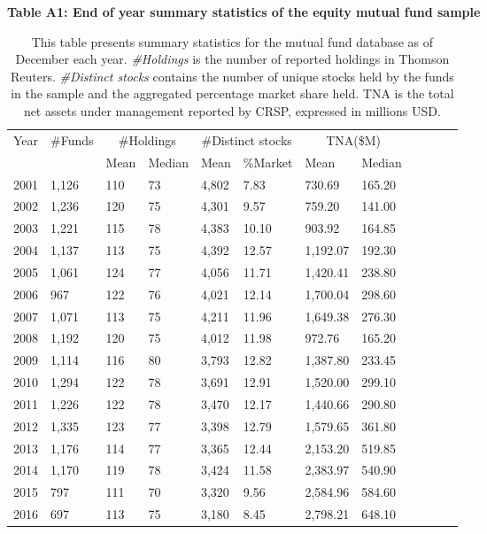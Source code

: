 \begin{singlespacing}
\begin{table}[h!]
\centering
\small
\setlength{\tabcolsep}{14pt}
{\captionsetup{justification=centering,singlelinecheck=off}
\caption*{\bfseries Table A1: End of year summary statistics of the equity mutual fund sample} }
\caption*{This table presents summary statistics for the mutual fund database as of December each year. \textit{\#Holdings} is the number of reported holdings in Thomson Reuters. \textit{\#Distinct stocks} contains the number of unique stocks held by the funds in the sample and the aggregated percentage market share held. TNA is the total net assets under management reported by CRSP, expressed in millions USD.    } \label{tableA1} 
\begin{tabular}{llllllllllll}
\hline
Year & \#Funds & \multicolumn{2}{c}{\#Holdings} & \multicolumn{2}{c}{\#Distinct stocks} & \multicolumn{2}{c}{TNA(\$M)}  \\ \cline{3-8} 
     &           & Mean           & Median          & Mean            & \%Market           & Mean           & Median             \\ \hline
     2001 & 1,126 & 110    & 73 & 4,802 & 7.83  & 730.69  & 165.20 \\
2002 & 1,236 & 120 & 75 & 4,301 & 9.57  & 759.20  & 141.00 \\
2003 & 1,221 & 115 & 78 & 4,383 & 10.10 & 903.92  & 164.85 \\
2004 & 1,137 & 113 & 75 & 4,392 & 12.57 & 1,192.07 & 192.30 \\
2005 & 1,061 & 124 & 77 & 4,056 & 11.71 & 1,420.41 & 238.80 \\
2006 & 967  & 122 & 76 & 4,021 & 12.14 & 1,700.04 & 298.60 \\
2007 & 1,071 & 113 & 75 & 4,211 & 11.96 & 1,649.38 & 276.30 \\
2008 & 1,192 & 120 & 75 & 4,012 & 11.98 & 972.76  & 165.20 \\
2009 & 1,114 & 116 & 80 & 3,793 & 12.82 & 1,387.80 & 233.45 \\
2010 & 1,294 & 122 & 78 & 3,691 & 12.91 & 1,520.00 & 299.10 \\
2011 & 1,226 & 122 & 78 & 3,470 & 12.17 & 1,440.66 & 290.80 \\
2012 & 1,335 & 123 & 77 & 3,398 & 12.79 & 1,579.65 & 361.80 \\
2013 & 1,176 & 114 & 77 & 3,365 & 12.44 & 2,153.20 & 519.85 \\
2014 & 1,170 & 119 & 78 & 3,424 & 11.58 & 2,383.97 & 540.90 \\
2015 & 797  & 111 & 70 & 3,320 & 9.56  & 2,584.96 & 584.60 \\
2016 & 697  & 113 & 75 & 3,180 & 8.45  & 2,798.21 & 648.10
 \\ \hline   
\end{tabular}
\end{table}
\end{singlespacing}

